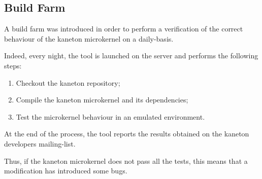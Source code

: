 %
%
%
%
%
%

%
%

\subsection{Build Farm}
\label{section:build farm}

A build farm was introduced in order to perform a verification
of the correct behaviour of the kaneton microkernel on a daily-basis.

Indeed, every night, the  tool is launched on the
 server and performs the following steps:

\begin{enumerate}
  \item
    Checkout the kaneton repository;
  \item
    Compile the kaneton microkernel and its dependencies;
  \item
    Test the microkernel behaviour in an emulated environment.
\end{enumerate}

At the end of the process, the tool reports the results obtained on
the kaneton developers mailing-list.

Thus, if the kaneton microkernel does not pass all the tests, this means
that a modification has introduced some bugs.
